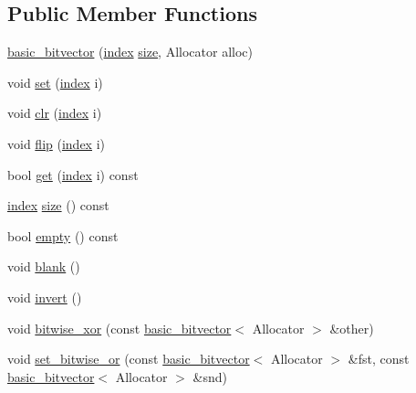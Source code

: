 \subsection*{Public Member Functions}
\begin{DoxyCompactItemize}
\item 
\hyperlink{classterraces_1_1basic__bitvector_aeb3cce162b70f7bcbbf51eefad7acce2}{basic\+\_\+bitvector} (\hyperlink{namespaceterraces_adbc33ccb543d1634e96d0eb02e472c77}{index} \hyperlink{classterraces_1_1basic__bitvector_a7a846347ea4c1c1f542ff3331307fdb9}{size}, Allocator alloc)
\item 
void \hyperlink{classterraces_1_1basic__bitvector_a08123518674191423e1f8872ef665650}{set} (\hyperlink{namespaceterraces_adbc33ccb543d1634e96d0eb02e472c77}{index} i)
\item 
void \hyperlink{classterraces_1_1basic__bitvector_a9701e586ebb927deaec8bbff3461c22a}{clr} (\hyperlink{namespaceterraces_adbc33ccb543d1634e96d0eb02e472c77}{index} i)
\item 
void \hyperlink{classterraces_1_1basic__bitvector_ad8f5d3222a2294e462f235ecd9dcb884}{flip} (\hyperlink{namespaceterraces_adbc33ccb543d1634e96d0eb02e472c77}{index} i)
\item 
bool \hyperlink{classterraces_1_1basic__bitvector_a13da8f2c63010742d71c351cababc2d3}{get} (\hyperlink{namespaceterraces_adbc33ccb543d1634e96d0eb02e472c77}{index} i) const
\item 
\hyperlink{namespaceterraces_adbc33ccb543d1634e96d0eb02e472c77}{index} \hyperlink{classterraces_1_1basic__bitvector_a7a846347ea4c1c1f542ff3331307fdb9}{size} () const
\item 
bool \hyperlink{classterraces_1_1basic__bitvector_afe730070283b54ea7013300950488eea}{empty} () const
\item 
void \hyperlink{classterraces_1_1basic__bitvector_aa52688df4fe89e58f1e45b41faf7e068}{blank} ()
\item 
void \hyperlink{classterraces_1_1basic__bitvector_a8a1d7d4cd0916068c73e3412347c7b18}{invert} ()
\item 
void \hyperlink{classterraces_1_1basic__bitvector_ac21b3d7ece4c87cfc4967d7fefb55c54}{bitwise\+\_\+xor} (const \hyperlink{classterraces_1_1basic__bitvector}{basic\+\_\+bitvector}$<$ Allocator $>$ \&other)
\item 
void \hyperlink{classterraces_1_1basic__bitvector_a3e071c2698f1e19765b3c968a80ea65e}{set\+\_\+bitwise\+\_\+or} (const \hyperlink{classterraces_1_1basic__bitvector}{basic\+\_\+bitvector}$<$ Allocator $>$ \&fst, const \hyperlink{classterraces_1_1basic__bitvector}{basic\+\_\+bitvector}$<$ Allocator $>$ \&snd)

\end{DoxyCompactItemize}
